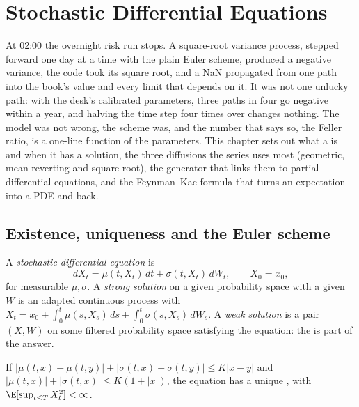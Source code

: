 \chapter{Stochastic Differential Equations}\label{ch:qm:stochastic-differential-equations}

At 02:00 the overnight risk run stops. A square-root variance process, stepped forward one
day at a time with the plain Euler scheme, produced a negative variance, the code took its
square root, and a NaN propagated from one path into the book's value and every limit that
depends on it. It was not one unlucky path: with the desk's calibrated parameters, three paths
in four go negative within a year, and halving the time step four times over changes nothing.
The model was not wrong, the scheme was, and the number that says so, the Feller ratio, is a
one-line function of the parameters. This chapter sets out what a  is and when it has a solution, the three diffusions the series uses most (geometric,
mean-reverting and square-root), the generator that links them to partial differential
equations, and the Feynman--Kac formula that turns an expectation into a PDE and back.

\section{Existence, uniqueness and the Euler scheme}

\begin{definition}\label{def:qm:stochastic-differential-equations:sde}
A \emph{stochastic differential equation} is
\[
dX_t = \mu(t, X_t)\,dt + \sigma(t, X_t)\,dW_t, \qquad X_0 = x_0,
\]
for measurable $\mu, \sigma$. A \emph{strong solution} on a given
probability space with a given  $W$ is an adapted continuous process with
$X_t = x_0 + \int_0^t\mu(s, X_s)\,ds + \int_0^t\sigma(s, X_s)\,dW_s$. A \emph{weak
solution} is a pair $(X, W)$ on some filtered probability space satisfying
the equation: the  is part of the answer.
\end{definition}

\begin{theorem}\label{thm:qm:stochastic-differential-equations:exist}
If $|\mu(t,x) - \mu(t,y)| + |\sigma(t,x) - \sigma(t,y)| \le K|x - y|$ and $|\mu(t,x)| + |\sigma(t,x)|
\le K(1 + |x|)$, the equation has a unique , with $\E[\sup_{t\le T}X_t^2] <
\infty$.
\end{theorem}

